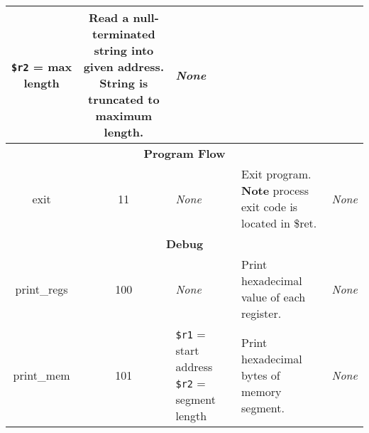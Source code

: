 \documentclass{article}
\begin{document}
\begin{longtable}{|c|c|l|l|l|}
{    \texttt{\$r2} = max length} & \makecell[l]{Read a null-terminated string into given address.\\%
    String is truncated to maximum length.} & \textit{None} \\
    \hline \hline
    \multicolumn{5}{|c|}{\textbf{Program Flow}} \\
    \hline
    exit & 11 & \textit{None} & \makecell[l]{Exit program.\\%
    \textbf{Note} process exit code is located in \$ret.} & \textit{None} \\
    \hline \hline
    \multicolumn{5}{|c|}{\textbf{Debug}} \\
    \hline
    print\_regs & 100 & \textit{None} & Print hexadecimal value of each register. & \textit{None} \\
    \hline
    print\_mem & 101 & \makecell[l]{\texttt{\$r1} = start address\\%
    \texttt{\$r2} = segment length} & Print hexadecimal bytes of memory segment. & \textit{None} \\
    \hline
\end{longtable}
\end{document}

